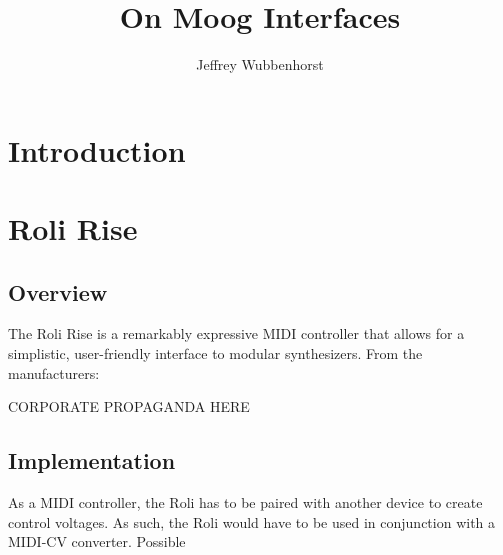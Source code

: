 \documentclass[12pt,letterpaper]{article}
\author{Jeffrey Wubbenhorst}
\title{On Moog Interfaces}
\begin{document}
\maketitle
\section*{Introduction}


\section*{Roli Rise}

\subsection*{Overview}

The Roli Rise is a remarkably expressive MIDI controller that allows for a simplistic, user-friendly interface to modular synthesizers. From the manufacturers: 

{\huge {\color{red} CORPORATE PROPAGANDA HERE}} 

\subsection*{Implementation}

As a MIDI controller, the Roli has to be paired with another device to create control voltages. As such, the Roli would have to be used in conjunction with a MIDI-CV converter. Possible 
\end{document}
